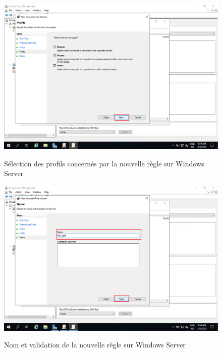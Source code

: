 \begin{figure}[h!]
	\begin{center}
		\caption{Sélection des profils concernés par la nouvelle règle sur Windows Server}
		\includegraphics[scale=0.5]{WS_Screenshots/gpo_20.png}
		\label{WS_Screenshots/gpo_20}
	\end{center}
\end{figure}
\FloatBarrier 
    

\begin{figure}[h!]
	\begin{center}
		\caption{Nom et validation de la nouvelle règle sur Windows Server}
		\includegraphics[scale=0.5]{WS_Screenshots/gpo_21.png}
		\label{WS_Screenshots/gpo_21}
	\end{center}
\end{figure}
\FloatBarrier